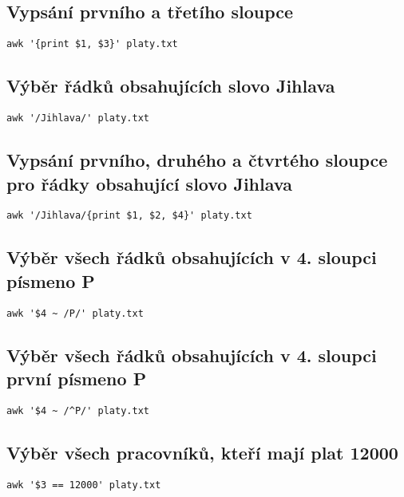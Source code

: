 \documentclass{article}
\begin{document}
\subsection{Vypsání prvního a třetího sloupce}

\begin{lstlisting}
awk '{print $1, $3}' platy.txt
\end{lstlisting}

\subsection{Výběr řádků obsahujících slovo Jihlava}

\begin{lstlisting}
awk '/Jihlava/' platy.txt
\end{lstlisting}

\subsection{Vypsání prvního, druhého a čtvrtého sloupce pro řádky obsahující slovo Jihlava}

\begin{lstlisting}
awk '/Jihlava/{print $1, $2, $4}' platy.txt
\end{lstlisting}

\subsection{Výběr všech řádků obsahujících v 4. sloupci písmeno P}

\begin{lstlisting}
awk '$4 ~ /P/' platy.txt
\end{lstlisting}

\subsection{Výběr všech řádků obsahujících v 4. sloupci první písmeno P}

\begin{lstlisting}
awk '$4 ~ /^P/' platy.txt
\end{lstlisting}

\subsection{Výběr všech pracovníků, kteří mají plat 12000}

\begin{lstlisting}
awk '$3 == 12000' platy.txt
\end{lstlisting}
\end{document}
